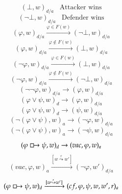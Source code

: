 \documentclass[a4paper,american]{paper}
\begin{document}
\begin{figure}[H]
	\centering
	\begin{equation}
		(\bot ,w)_{d/a}\hspace{10pt}\text{Attacker wins}
	\end{equation}
	\begin{equation}
		(\neg\bot ,w)_{d/a}\hspace{10pt}\text{Defender wins}
	\end{equation}
	\begin{equation}
		(\varphi ,w)_{d/a}\xrightarrow{\varphi\in F(w)}(\neg\bot ,w)_{d/a}
	\end{equation}
	\begin{equation}
		(\varphi ,w)_{d/a}\xrightarrow{\varphi\not\in F(w)}(\bot ,w)_{d/a}
	\end{equation}
	\begin{equation}
		(\neg\varphi ,w)_{d/a}\xrightarrow{\varphi\in F(w)}(\bot ,w)_{d/a}
	\end{equation}
	\begin{equation}
		(\neg\varphi ,w)_{d/a}\xrightarrow{\varphi\not\in F(w)}(\neg\bot ,w)_{d/a}
	\end{equation}
	\begin{equation}
		(\neg\neg\varphi ,w)_{d/a}\rightarrow (\varphi ,w)_{d/a}
	\end{equation}
	\begin{equation}
		(\varphi\vee\psi ,w)_d\rightarrow (\varphi ,w)_{d/a}
	\end{equation}
	\begin{equation}
		(\varphi\vee\psi ,w)_d\rightarrow (\psi ,w)_{d/a}
	\end{equation}
	\begin{equation}
		(\neg (\varphi\vee\psi ),w)_a\rightarrow (\neg\varphi ,w)_{d/a}
	\end{equation}
	\begin{equation}
		(\neg (\varphi\vee\psi ),w)_a\rightarrow (\neg\psi ,w)_{d/a}
	\end{equation}
	\begin{equation}
		(\varphi\boxright\psi ,w)_d\rightarrow (vac,\varphi ,w)_a
	\end{equation}
	\begin{equation}
		(vac,\varphi ,w)_a\xrightarrow{[w\overset{r}{\leadsto}w']}(\neg\varphi ,w')_{d/a}
	\end{equation}
	\begin{equation}
		(\varphi\boxright\psi ,w)_d\xrightarrow{[w\overset{r}{\leadsto}w']}(cf,\varphi ,\psi ,w,w',r)_a

\end{equation}
\end{figure}
\end{document}
